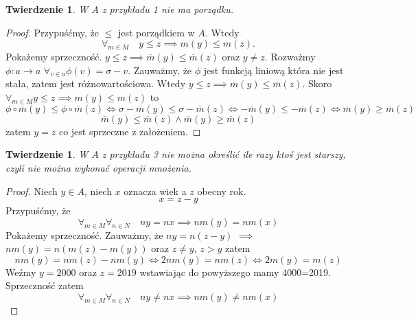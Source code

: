 \documentclass[12pt,a4paper]{report}
\newtheorem{tw}[definition]{Twierdzenie}
\begin{document}
\begin{tw}
W $A$ z przykładu 1 nie ma porządku.
\end{tw}
\begin{proof}
Przypuśćmy, że $\le$ jest porządkiem w $A$. Wtedy
\begin{equation*}
\forall_{m\in M} \quad y \le z \implies m(y) \le m(z).
\end{equation*}
Pokażemy sprzeczność. $y\le z \implies \overline{m}(y)\le \overline{m}(z)$ oraz $y\ne z$. Rozważmy $\phi :a \to a$ $\forall_{v \in a} \phi(v) = \sigma -v$. Zauważmy, że $\phi$ jest funkcją liniową która nie jest stała, zatem jest różnowartościowa. Wtedy $y \le z \implies \overline{m}(y) \le \overline{m}(z)$. Skoro $\forall_{m \in M} y\le z \implies m(y) \le m(z)$ to 
\begin{equation*}
\phi \circ \overline{m}(y) \le \phi \circ \overline{m}(z) \iff \sigma -\overline{m}(y) \le \sigma - \overline{m}(z)\iff -\overline{m}(y) \le -\overline{m}(z) \iff \overline{m}(y) \ge \overline{m}(z)
\end{equation*}
\begin{equation*}
\overline{m}(y) \le \overline{m}(z) \land \overline{m}(y) \ge \overline{m}(z)
\end{equation*}
zatem $y=z$ co jest sprzeczne z założeniem.

\end{proof}
\begin{tw}
W $A$ z przykładu 3 nie można określić ile razy ktoś jest starszy, czyli nie można wykonać operacji mnożenia.
\end{tw}
\begin{proof}
Niech $y \in A$, niech $x$ oznacza wiek a $z$ obecny rok.
\begin{equation*}
x=z-y
\end{equation*}
Przypuśćmy, że 
\begin{equation*}
\forall_{m \in M} \forall_{n \in N}\quad ny=nx \implies nm(y)=nm(x)
\end{equation*}
Pokażemy sprzeczność. Zauważmy, że $ny=n(z-y)$ $\implies$ $nm(y)=n(m(z)-m(y))$ oraz $z \ne y$, $z>y$ zatem
\begin{equation*}
nm(y)=nm(z)-nm(y) \iff 2nm(y)=nm(z) \iff 2m(y)=m(z)
\end{equation*}
Weźmy $y=2000$ oraz $z=2019$ wstawiając do powyższego mamy 4000=2019. Sprzeczność zatem
\begin{equation*}
\forall_{m \in M} \forall_{n \in N}\quad ny\ne nx \implies nm(y)\ne nm(x)
\end{equation*}
\end{proof}
\end{document}
